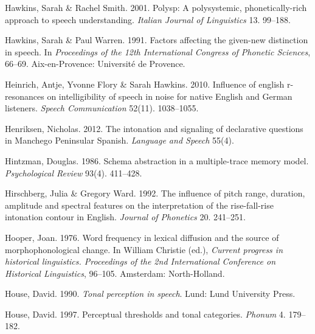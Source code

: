 \documentclass[ number=1
,series=labphon
,output=long
,url=http://langsci-press.org/catalog/book/16
,isbn=978-3-944675-01-5
]{LSP/langsci}
\begin{document}
\begin{thebibliography}{284}
Hawkins, Sarah \& Rachel Smith. 2001.
\newblock Polysp: {A} polysystemic, phonetically-rich approach to speech
  understanding.
\newblock \emph{Italian Journal of Linguistics} 13. 99--188.

Hawkins, Sarah \& Paul Warren. 1991.
\newblock Factors affecting the given-new distinction in speech.
\newblock In \emph{Proceedings of the 12th {I}nternational {C}ongress of
  {P}honetic {S}ciences}, 66--69. Aix-en-Provence: Universit\'{e} de Provence.

Heinrich, Antje, Yvonne Flory \& Sarah Hawkins. 2010.
\newblock Influence of english r-resonances on intelligibility of speech in
  noise for native {E}nglish and {G}erman listeners.
\newblock \emph{Speech Communication} 52(11). 1038--1055.

Henriksen, Nicholas. 2012.
\newblock The intonation and signaling of declarative questions in {M}anchego
  {P}eninsular {S}panish.
\newblock \emph{Language and Speech} 55(4).

\enlargethispage{\baselineskip}
Hintzman, Douglas. 1986.
\newblock Schema abstraction in a multiple-trace memory model.
\newblock \emph{Psychological Review} 93(4). 411--428.

Hirschberg, Julia \& Gregory Ward. 1992.
\newblock The influence of pitch range, duration, amplitude and spectral
  features on the interpretation of the rise-fall-rise intonation contour in
  {E}nglish.
\newblock \emph{Journal of {P}honetics} 20. 241--251.

Hooper, Joan. 1976.
\newblock Word frequency in lexical diffusion and the source of
  morphophonological change.
\newblock In William Christie (ed.), \emph{Current progress in historical
  linguistics. {P}roceedings of the 2nd {I}nternational {C}onference on
  {H}istorical {L}inguistics}, 96--105. Amsterdam: North-Holland.

House, David. 1990.
\newblock \emph{Tonal perception in speech}.
\newblock Lund: Lund University Press.

House, David. 1997.
\newblock Perceptual thresholds and tonal categories.
\newblock \emph{Phonum} 4. 179--182.


\end{thebibliography}
\end{document}
